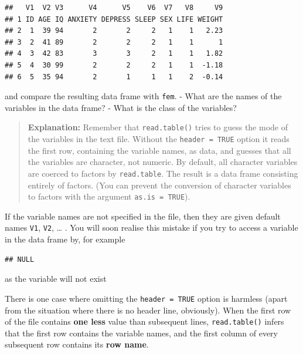 \documentclass[
]{book}
\newenvironment{Shaded}{\begin{snugshade}}{\end{snugshade}}
\newcommand{\NormalTok}[1]{#1}
\newcommand{\SpecialCharTok}[1]{\textcolor[rgb]{0.81,0.36,0.00}{\textbf{#1}}}
\begin{document}
\begin{verbatim}
##   V1  V2 V3      V4      V5    V6  V7   V8     V9
## 1 ID AGE IQ ANXIETY DEPRESS SLEEP SEX LIFE WEIGHT
## 2  1  39 94       2       2     2   1    1   2.23
## 3  2  41 89       2       2     2   1    1      1
## 4  3  42 83       3       3     2   1    1   1.82
## 5  4  30 99       2       2     2   1    1  -1.18
## 6  5  35 94       2       1     1   1    2  -0.14
\end{verbatim}

and compare the resulting data frame with \texttt{fem}.
- What are the names of the variables in the data frame?
- What is the class of the variables?

\begin{quote}
\textbf{Explanation:} Remember that \texttt{read.table()} tries to guess
the mode of the variables in the text file. Without the
\texttt{header\ =\ TRUE} option it reads the first row, containing the
variable names, as data, and guesses that all the variables are
character, not numeric. By default, all character variables are
coerced to factors by \texttt{read.table}. The result is a data frame
consisting entirely of factors. (You can prevent the conversion of
character variables to factors with the argument \texttt{as.is\ =\ TRUE}).
\end{quote}

If the variable names are not specified in the file, then they are
given default names \texttt{V1}, \texttt{V2}, \ldots{} . You will soon realise this
mistake if you try to access a variable in the data frame by, for
example

\begin{Shaded}
\end{Shaded}

\begin{verbatim}
## NULL
\end{verbatim}

as the variable will not exist

There is one case where omitting the \texttt{header\ =\ TRUE} option is
harmless (apart from the situation where there is no header line,
obviously). When the first row of the file contains \textbf{one less}
value than subsequent lines, \texttt{read.table()} infers that the first
row contains the variable names, and the first column of every
subsequent row contains its \textbf{row name}.
\end{document}
